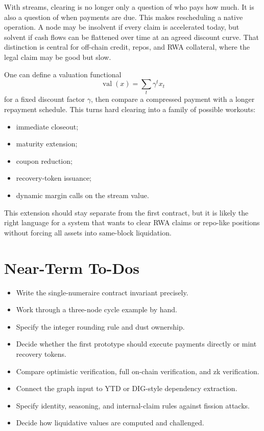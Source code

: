 \documentclass[11pt,oneside]{article}
\begin{document}
With streams, clearing is no longer only a question of who pays how much. It is
also a question of when payments are due. This makes rescheduling a native
operation. A node may be insolvent if every claim is accelerated today, but
solvent if cash flows can be flattened over time at an agreed discount curve.
That distinction is central for off-chain credit, repos, and RWA collateral,
where the legal claim may be good but slow.

One can define a valuation functional
\[
  \operatorname{val}(x)=\sum_t \gamma^t x_t
\]
for a fixed discount factor $\gamma$, then compare a compressed payment with a
longer repayment schedule. This turns hard clearing into a family of possible
workouts:

\begin{itemize}[leftmargin=1.5em]
  \item immediate closeout;
  \item maturity extension;
  \item coupon reduction;
  \item recovery-token issuance;
  \item dynamic margin calls on the stream value.
\end{itemize}

This extension should stay separate from the first contract, but it is likely
the right language for a system that wants to clear RWA claims or repo-like
positions without forcing all assets into same-block liquidation.

\section{Near-Term To-Dos}

\begin{itemize}[leftmargin=1.5em]
  \item Write the single-numeraire contract invariant precisely.
  \item Work through a three-node cycle example by hand.
  \item Specify the integer rounding rule and dust ownership.
  \item Decide whether the first prototype should execute payments directly or
  mint recovery tokens.
  \item Compare optimistic verification, full on-chain verification, and zk
  verification.
  \item Connect the graph input to YTD or DIG-style dependency extraction.
  \item Specify identity, seasoning, and internal-claim rules against fission
  attacks.
  \item Decide how liquidative values are computed and challenged.
\end{itemize}
\end{document}
